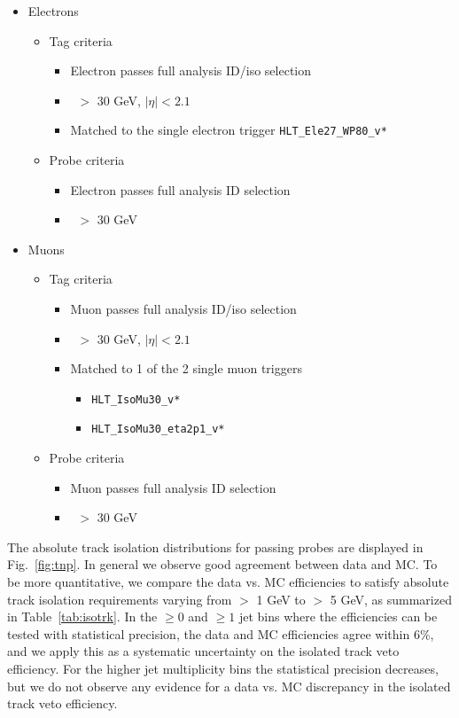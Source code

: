 \begin{itemize}
  \item{Electrons}

    \begin{itemize}
    \item{Tag criteria}

      \begin{itemize}
      \item Electron passes full analysis ID/iso selection 
      \item \pt\ $>$ 30 GeV, $|\eta|<2.1$ 
      \item Matched to the single electron trigger \verb=HLT_Ele27_WP80_v*=
      \end{itemize}

    \item{Probe criteria}
      \begin{itemize}
      \item Electron passes full analysis ID selection
      \item \pt\ $>$ 30 GeV
      \end{itemize}
      \end{itemize}
  \item{Muons}
    \begin{itemize}
    \item{Tag criteria}
      \begin{itemize}
      \item Muon passes full analysis ID/iso selection
      \item \pt\ $>$ 30 GeV, $|\eta|<2.1$
      \item Matched to 1 of the 2 single muon triggers
        \begin{itemize}
        \item \verb=HLT_IsoMu30_v*=
        \item \verb=HLT_IsoMu30_eta2p1_v*=
        \end{itemize}
      \end{itemize}
    \item{Probe criteria}
      \begin{itemize}
      \item Muon passes full analysis ID selection
      \item \pt\ $>$ 30 GeV
      \end{itemize}
    \end{itemize}
\end{itemize}

The absolute track isolation distributions for passing probes are displayed in Fig.~\ref{fig:tnp}. In general we observe
good agreement between data and MC. To be more quantitative, we compare the data vs. MC efficiencies to satisfy
absolute track isolation requirements varying from $>$ 1 GeV to $>$ 5 GeV, as summarized in Table~\ref{tab:isotrk}.
In the $\geq 0$ and $\geq 1$ jet bins where the efficiencies can be tested with statistical precision, the data and MC
efficiencies agree within 6\%, and we apply this as a systematic uncertainty on the isolated track veto efficiency.
For the higher jet multiplicity bins the statistical precision decreases, but we do not observe any evidence for
a data vs. MC discrepancy in the isolated track veto efficiency.


